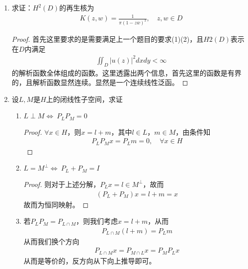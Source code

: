 \begin{enumerate}[leftmargin=2cm, label=\arabic*]
\begin{enumerate}[leftmargin=1cm, label=(\arabic*)]
        \item 对任意固定的$y\in S$，作为$x$的函数有$K(x,y)\in H$；
        \item $f(y) = (f, K(\cdot,y))$，$\forall f\in H$，$\forall y\in S$。
    \end{enumerate}
    \begin{proof}
        我们自然的会想到利用 Riesz 表示定理，即存在唯一的$K_y \in H$，使得$J_x(f) = (f, K_y) = f(x)$。这里$K_y$依赖于$y$，我们记$k(x,y) = (ky, kx)$，则固定 $y\in S$，$K(x,y) = k_y(x)\in H$，而同理 $f(y) = (f, k_y)k_y = (f,K(\cdot, y))$。
    \end{proof}
    \item 求证：$H^2(D)$的再生核为 
    \begin{align*}
        K(z,w) = \frac{1}{\pi(1-z\overline{w})^2},\quad z,w\in D
    \end{align*}
    \begin{proof}
        首先这里要求的是需要满足上一个题目的要求(1)(2)，且$H2(D)$表示在$D$内满足
        \begin{align*}
           \iint_{D} |u(z)|^2 dxdy < \infty
        \end{align*}
        的解析函数全体组成的函数。这里透露出两个信息，首先这里的函数是有界的，且解析函数显然连续。显然是一个连续线性泛函。
    \end{proof}
    \item 设$L,M$是$H$上的闭线性子空间，求证
    \begin{enumerate}[leftmargin=1cm, label=(\arabic*)]
        \item $L\perp M\Leftrightarrow\ P_LP_M = 0$
        \begin{proof}
            $\forall x\in H$，则$x = l + m$，其中$l\in L$，$m\in M$，由条件知
            \begin{align*}
                P_L P_M x = P_L m = 0,\quad \forall x\in H            \end{align*}
        \end{proof}

        \item $L = M^{\perp}\Leftrightarrow\ P_L + P_M = I$
        \begin{proof}
            则对于上述分解，$P_L x = l \in M^{\perp}$，故而
            \begin{align*}
                (P_L + P_M )x = l + m =  x
            \end{align*}
            故而为恒同映射。
        \end{proof}

        \item 若$P_LP_M = P_{L\cap M}$，则我们考虑$x = l + m$，从而
        \begin{align*}
            P_{L\cap M} (l + m) = P_L m
        \end{align*}
        从而我们换个方向
        \begin{align*}
            P_{L \cap M} x = P_{M\cap L} x = P_M P_L x
        \end{align*}
        从而是等价的，反方向从下向上推导即可。
    \end{enumerate}
\end{enumerate}


